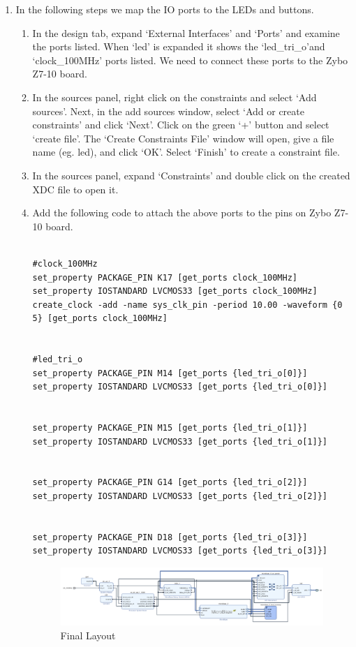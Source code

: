 \documentclass[11pt,twoside,titlepage]{article}
\begin{document}
\begin{enumerate}
\begin{enumerate}
			
			\item  Right click on the diagram and select `Regenerate Layout'. The final layout should look like Figure \ref{lay1}.  
			
			
		\end{enumerate}  
		\item In the following steps we map the IO ports to the LEDs and buttons.  
		\begin{enumerate} 
			
			\item In the design tab, expand `External Interfaces' and `Ports' and examine the ports listed. When `led' is expanded it shows the `led\_tri\_o'and `clock\_100MHz' ports listed. We need to connect these ports to the Zybo Z7-10 board.
			
			\item  In the sources panel, right click on the constraints  and select `Add sources'. Next, in the add sources window, select  `Add or create constraints' and click `Next'. Click on the green `+' button and select `create file'. The `Create Constraints File' window will open, give a file name (eg. led), and click `OK'. Select `Finish' to create a constraint file.
			\item In the sources panel, expand `Constraints' and double click on the created XDC file to open it.
			\item Add the following code to attach the above ports to the pins on Zybo Z7-10 board. 
			\begin{lstlisting}
			
#clock_100MHz
set_property PACKAGE_PIN K17 [get_ports clock_100MHz]
set_property IOSTANDARD LVCMOS33 [get_ports clock_100MHz]
create_clock -add -name sys_clk_pin -period 10.00 -waveform {0 5} [get_ports clock_100MHz]


#led_tri_o
set_property PACKAGE_PIN M14 [get_ports {led_tri_o[0]}]
set_property IOSTANDARD LVCMOS33 [get_ports {led_tri_o[0]}]


set_property PACKAGE_PIN M15 [get_ports {led_tri_o[1]}]
set_property IOSTANDARD LVCMOS33 [get_ports {led_tri_o[1]}]


set_property PACKAGE_PIN G14 [get_ports {led_tri_o[2]}]
set_property IOSTANDARD LVCMOS33 [get_ports {led_tri_o[2]}]


set_property PACKAGE_PIN D18 [get_ports {led_tri_o[3]}]
set_property IOSTANDARD LVCMOS33 [get_ports {led_tri_o[3]}]
			\end{lstlisting}
			
			\begin{figure}[h]
				\begin{center}
					\includegraphics[width=1.0\textwidth]{lab2final}
					\caption{Final Layout}
					\label{lay1}
				\end{center}
			\end{figure}
			

\end{enumerate}
\end{enumerate}
\end{document}
